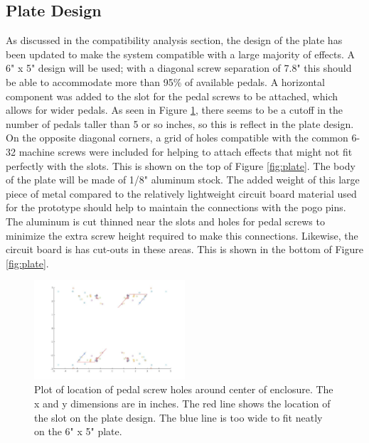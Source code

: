 \documentclass{article}
\begin{document}
	\subsection{Plate Design}

	As discussed in the compatibility analysis section, the design of the plate has been updated to make the system compatible with a large majority of effects.  A 6" x 5" design will be used; with a diagonal screw separation of 7.8" this should be able to accommodate more than 95\% of available pedals.  A horizontal component was added to the slot for the pedal screws to be attached, which allows for wider pedals.  As seen in Figure \ref{fig:pedaldimwslot}, there seems to be a cutoff in the number of pedals taller than 5 or so inches, so this is reflect in the plate design.  On the opposite diagonal corners, a grid of holes compatible with the common 6-32 machine screws were included for helping to attach effects that might not fit perfectly with the slots.  This is shown on the top of Figure \ref{fig:plate}.  The body of the plate will be made of 1/8" aluminum stock.  The added weight of this large piece of metal compared to the relatively lightweight circuit board material used for the prototype should help to maintain the connections with the pogo pins.  The aluminum is cut thinned near the slots and holes for pedal screws to minimize the extra screw height required to make this connections.  Likewise, the circuit board is has cut-outs in these areas.  This is shown in the bottom of Figure \ref{fig:plate}.

	\begin{figure}
		\centering
		\includegraphics[width = 0.5\textwidth]{PR5Images/PedalDimPlotwSlot.jpg}
		\caption{Plot of location of pedal screw holes around center of enclosure.  The x and y dimensions are in inches.  The red line shows the location of the slot on the plate design.  The blue line is too wide to fit neatly on the 6" x 5" plate.}
		\label{fig:pedaldimwslot}
	\end{figure}
\end{document}

